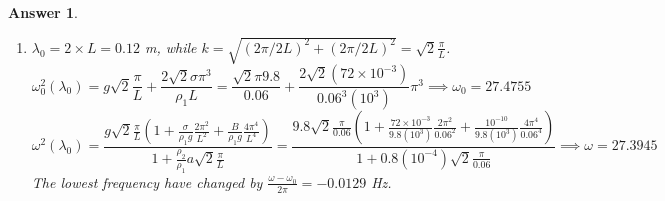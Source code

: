 \documentclass[a4paper]{article}
\newtheorem{ans}{Answer}[subsection]
\theoremstyle{new}
\begin{document}
\begin{ans}
\begin{enumerate}[label=(\roman*)]
We have $\lim_{k\rightarrow0}\frac{\omega^2}{\omega_0^2}\approx(1+\frac{\sigma k^2}{\rho_1g}(1-\frac{\rho_2}{\rho_1}ak)\approx 1$ and $\lim_{k\rightarrow\infty}\frac{\omega^2}{\omega_0^2}\approx\frac{Bkg\rho_1^2}{\rho_1g\rho_2\sigma a}\rightarrow\infty$.
\item $\lambda_0=2\times L=0.12$ m, while $k=\sqrt{(2\pi/2L)^2+(2\pi/2L)^2}=\sqrt{2}\frac{\pi}{L}$. 
$$\omega_0^2(\lambda_0)=g\sqrt{2}\frac{\pi}{L}+\frac{2\sqrt{2}\sigma\pi^3}{\rho_1L}=\frac{\sqrt{2}\pi9.8}{0.06}+\frac{2\sqrt{2}(72\times10^{-3})}{0.06^3(10^3)}\pi^3\implies\omega_0=27.4755$$
$$\omega^2(\lambda_0)=\frac{g\sqrt{2}\frac{\pi}{L}(1+\frac{\sigma}{\rho_1g}\frac{2\pi^2}{L^2}+\frac{B}{\rho_1g}\frac{4\pi^4}{L^4})}{1+\frac{\rho_2}{\rho_1}a\sqrt{2}\frac{\pi}{L}}=\frac{9.8\sqrt{2}\frac{\pi}{0.06}(1+\frac{72\times10^{-3}}{9.8(10^3)}\frac{2\pi^2}{0.06^2}+\frac{10^{-10}}{9.8(10^3)}\frac{4\pi^4}{0.06^4})}{1+0.8(10^{-4})\sqrt{2}\frac{\pi}{0.06}}\implies\omega=27.3945$$
The lowest frequency have changed by $\frac{\omega-\omega_0}{2\pi}=-0.0129$ Hz.
\end{enumerate}
\end{ans}
\newpage
\end{document}
